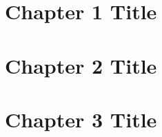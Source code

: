 \documentclass[letterpaper,12pt]{report}
\begin{document}
\begin{linenumbers}

\tableofcontents
\listoffigures

\chapter*{Chapter 1 Title}


\chapter*{Chapter 2 Title}


\chapter*{Chapter 3 Title}

\printbibliography[heading=subbibintoc]



% 





\end{linenumbers}
\end{document}
